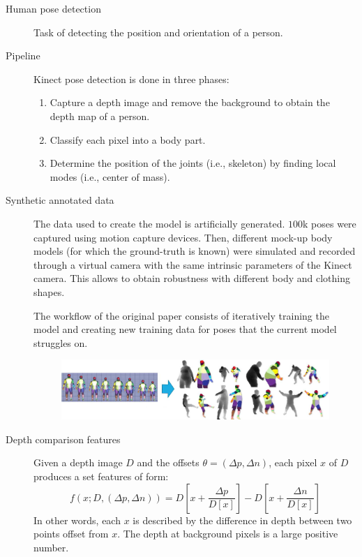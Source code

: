 \begin{description}
    \item[Human pose detection] 
        Task of detecting the position and orientation of a person.

    \item[Pipeline]
        Kinect pose detection is done in three phases:
        \begin{enumerate}
            \item Capture a depth image and remove the background to obtain the depth map of a person.
            \item Classify each pixel into a body part.
            \item Determine the position of the joints (i.e., skeleton) by finding local modes (i.e., center of mass).
        \end{enumerate}

    \item[Synthetic annotated data] 
        The data used to create the model is artificially generated. $100$k poses were captured using motion capture devices. Then, different mock-up body models (for which the ground-truth is known) were simulated and recorded through a virtual camera with the same intrinsic parameters of the Kinect camera. This allows to obtain robustness with different body and clothing shapes.

        \begin{remark}
            The workflow of the original paper consists of iteratively training the model and creating new training data for poses that the current model struggles on.
        \end{remark}

        \begin{figure}[H]
            \centering
            \includegraphics[width=0.75\linewidth]{./img/motion_data.jpg}
        \end{figure}

    \item[Depth comparison features] 
        Given a depth image $D$ and the offsets $\theta = (\Delta p, \Delta n)$, each pixel $x$ of $D$ produces a set features of form:
        \[ f(x; D, (\Delta p, \Delta n)) = D\left[ x + \frac{\Delta p}{D[x]} \right] - D\left[ x + \frac{\Delta n}{D[x]} \right] \]
        In other words, each $x$ is described by the difference in depth between two points offset from $x$. The depth at background pixels is a large positive number.


\end{description}
